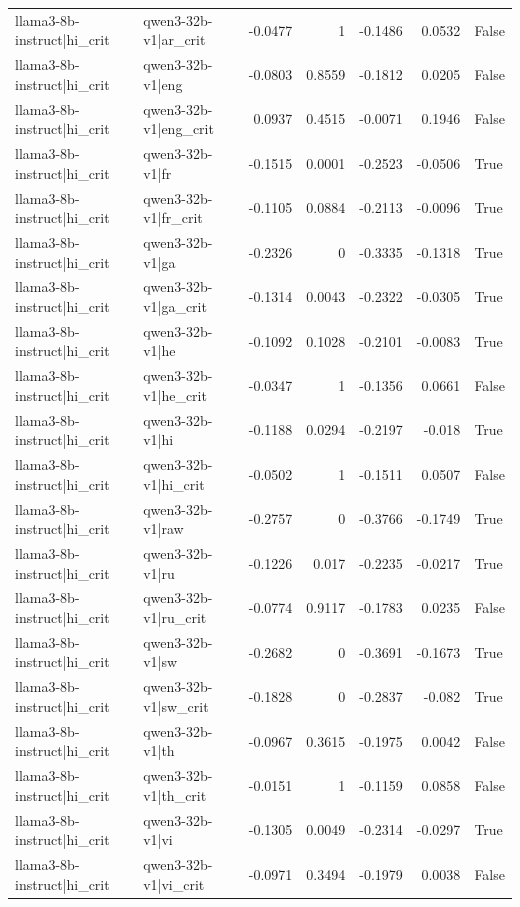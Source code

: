 \begin{table}
\begin{tabular}{l l r r r r l}
llama3-8b-instruct|hi_crit & qwen3-32b-v1|ar_crit & -0.0477 & 1 & -0.1486 & 0.0532 & False \\
llama3-8b-instruct|hi_crit & qwen3-32b-v1|eng & -0.0803 & 0.8559 & -0.1812 & 0.0205 & False \\
llama3-8b-instruct|hi_crit & qwen3-32b-v1|eng_crit & 0.0937 & 0.4515 & -0.0071 & 0.1946 & False \\
llama3-8b-instruct|hi_crit & qwen3-32b-v1|fr & -0.1515 & 0.0001 & -0.2523 & -0.0506 & True \\
llama3-8b-instruct|hi_crit & qwen3-32b-v1|fr_crit & -0.1105 & 0.0884 & -0.2113 & -0.0096 & True \\
llama3-8b-instruct|hi_crit & qwen3-32b-v1|ga & -0.2326 & 0 & -0.3335 & -0.1318 & True \\
llama3-8b-instruct|hi_crit & qwen3-32b-v1|ga_crit & -0.1314 & 0.0043 & -0.2322 & -0.0305 & True \\
llama3-8b-instruct|hi_crit & qwen3-32b-v1|he & -0.1092 & 0.1028 & -0.2101 & -0.0083 & True \\
llama3-8b-instruct|hi_crit & qwen3-32b-v1|he_crit & -0.0347 & 1 & -0.1356 & 0.0661 & False \\
llama3-8b-instruct|hi_crit & qwen3-32b-v1|hi & -0.1188 & 0.0294 & -0.2197 & -0.018 & True \\
llama3-8b-instruct|hi_crit & qwen3-32b-v1|hi_crit & -0.0502 & 1 & -0.1511 & 0.0507 & False \\
llama3-8b-instruct|hi_crit & qwen3-32b-v1|raw & -0.2757 & 0 & -0.3766 & -0.1749 & True \\
llama3-8b-instruct|hi_crit & qwen3-32b-v1|ru & -0.1226 & 0.017 & -0.2235 & -0.0217 & True \\
llama3-8b-instruct|hi_crit & qwen3-32b-v1|ru_crit & -0.0774 & 0.9117 & -0.1783 & 0.0235 & False \\
llama3-8b-instruct|hi_crit & qwen3-32b-v1|sw & -0.2682 & 0 & -0.3691 & -0.1673 & True \\
llama3-8b-instruct|hi_crit & qwen3-32b-v1|sw_crit & -0.1828 & 0 & -0.2837 & -0.082 & True \\
llama3-8b-instruct|hi_crit & qwen3-32b-v1|th & -0.0967 & 0.3615 & -0.1975 & 0.0042 & False \\
llama3-8b-instruct|hi_crit & qwen3-32b-v1|th_crit & -0.0151 & 1 & -0.1159 & 0.0858 & False \\
llama3-8b-instruct|hi_crit & qwen3-32b-v1|vi & -0.1305 & 0.0049 & -0.2314 & -0.0297 & True \\
llama3-8b-instruct|hi_crit & qwen3-32b-v1|vi_crit & -0.0971 & 0.3494 & -0.1979 & 0.0038 & False \\

\end{tabular}
\end{table}
